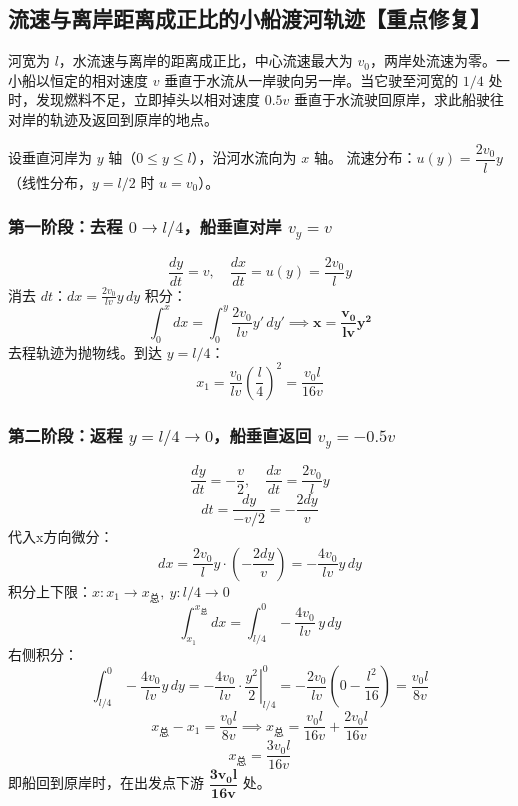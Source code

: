 \subsection{流速与离岸距离成正比的小船渡河轨迹【重点修复】}
河宽为 $l$，水流速与离岸的距离成正比，中心流速最大为 $v_0$，两岸处流速为零。一小船以恒定的相对速度 $v$ 垂直于水流从一岸驶向另一岸。当它驶至河宽的 $1/4$ 处时，发现燃料不足，立即掉头以相对速度 $0.5v$ 垂直于水流驶回原岸，求此船驶往对岸的轨迹及返回到原岸的地点。
\begin{solution}
设垂直河岸为 $y$ 轴（$0\le y\le l$），沿河水流向为 $x$ 轴。
流速分布：$u(y) = \dfrac{2v_0}{l}y$（线性分布，$y=l/2$ 时 $u=v_0$）。
\subsubsection{第一阶段：去程 \texorpdfstring{$0\to l/4$}{0到l/4}，船垂直对岸 \texorpdfstring{$v_y=v$}{vy=v}}
\[
\frac{dy}{dt}=v,\quad \frac{dx}{dt}=u(y)=\frac{2v_0}{l}y
\]
消去 $dt$：$\displaystyle dx = \frac{2v_0}{lv} y\,dy$
积分：
\[
\int_0^x dx = \int_0^y \frac{2v_0}{lv} y'\,dy' \implies \boldsymbol{x=\frac{v_0}{lv}y^2}
\]
去程轨迹为抛物线。到达 $y=l/4$：
\[
x_1 = \frac{v_0}{lv}\left(\frac{l}{4}\right)^2 = \frac{v_0 l}{16v}
\]
\subsubsection{第二阶段：返程 \texorpdfstring{$y=l/4 \to 0$}{y=l/4到0}，船垂直返回 \texorpdfstring{$v_y=-0.5v$}{vy=-0.5v}}
\[
\frac{dy}{dt}=-\frac{v}{2},\quad \frac{dx}{dt}=\frac{2v_0}{l}y
\]
\[
dt = \frac{dy}{-v/2}=-\frac{2dy}{v}
\]
代入x方向微分：
\[
dx = \frac{2v_0}{l}y \cdot \left(-\frac{2dy}{v}\right) = -\frac{4v_0}{lv} y\,dy
\]
积分上下限：$x:x_1 \to x_\text{总},\ y:l/4 \to 0$
\[
\int_{x_1}^{x_\text{总}} dx = \int_{l/4}^{0} -\frac{4v_0}{lv}\,y\,dy
\]
右侧积分：
\[
\int_{l/4}^{0} -\frac{4v_0}{lv}y\,dy
= -\frac{4v_0}{lv}\cdot\left.\frac{y^2}{2}\right|_{l/4}^{0}
= -\frac{2v_0}{lv}\left(0-\frac{l^2}{16}\right) = \frac{v_0 l}{8v}
\]
\[
x_\text{总} - x_1 = \frac{v_0 l}{8v} \implies x_\text{总} = \frac{v_0 l}{16v}+\frac{2v_0 l}{16v}
\]
\[
\boxed{x_\text{总} = \frac{3v_0 l}{16v}}
\]
即船回到原岸时，在出发点下游 $\boldsymbol{\dfrac{3v_0 l}{16v}}$ 处。
\end{solution}
